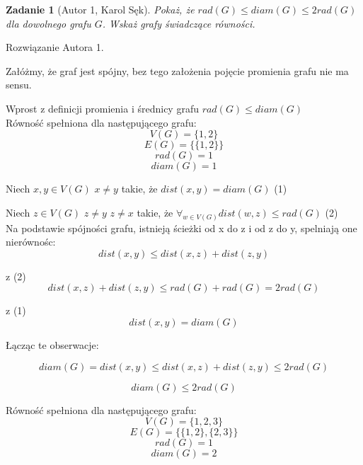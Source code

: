 \documentclass{mwart}
\newtheorem{zad}{Zadanie}[section]
\begin{document}
\begin{zad}[Autor 1, Karol Sęk]
    Pokaż, że $rad(G) \leq diam(G) \leq 2 rad(G)$ dla dowolnego grafu $G$. Wskaż grafy świadczące równości.
\end{zad}
\begin{mdframed}
    Rozwiązanie Autora 1.
\end{mdframed}
\begin{mdframed}
    Załóżmy, że graf jest spójny, bez tego założenia pojęcie promienia grafu nie ma sensu.

    Wprost z definicji promienia i średnicy grafu $rad(G) \leq diam(G)$\\

    Równość spełniona dla następującego grafu:\\
    $$V(G) = \{1,2\}$$
    $$E(G) =\{\{1,2\}\}$$
    $$rad(G) = 1$$
    $$diam(G)= 1$$


    Niech $x,y \in V(G)$ $x \neq y$ takie, że $dist(x,y) = diam(G)$  (1)

    Niech $z \in V(G)$ $z\neq y$ $z\neq x$ takie, że $ \forall_{w \in V(G)}dist(w,z) \leq rad(G)$ (2) \\

    Na podstawie spójności grafu, istnieją ścieżki od x do z i od z do y, spelniają one nierównośc:
    $$dist(x,y) \leq dist(x,z) + dist(z,y)$$

    z (2) 
    $$dist(x,z) + dist(z,y)  \leq rad(G) + rad(G) = 2rad(G)$$

    z (1)
    $$dist(x,y) = diam(G)$$

    Łącząc te obserwacje:

    $$diam(G) = dist(x,y) \leq dist(x,z) + dist(z,y)  \leq 2rad(G)$$

    $$diam(G) \leq 2rad(G)$$

    Równość spełniona dla następującego grafu:\\

    $$V(G) = \{1,2,3\}$$
    $$E(G) =\{\{1,2\},\{2,3\}\}$$
    $$rad(G) = 1$$ 
    $$diam(G)= 2$$


\end{mdframed}
\end{document}
